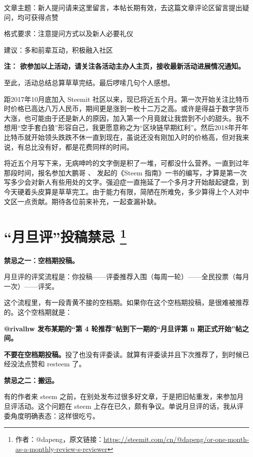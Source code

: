 \documentclass[]{ctexbook}
\begin{document}
文章主题：新人提问请来这里留言，本帖长期有效，去这篇文章评论区留言提出疑问，均可获得点赞

格式要求：注意提问方式以及新人必要礼仪

建议：多和前辈互动，积极融入社区

\textbf{注：
欲参加以上活动，请关注各活动主办人主页，接收最新活动进展情况通知。}

至此，活动总结总算草草完结。最后啰嗦几句个人感想。

距2017年10月底加入 Steemit 社区以来，现已将近五个月。第一次开始关注比特币时价格已高达八万人民币，期间更是涨到一枚十二万之高。或许是得益于数字货币大涨，也可能由于还是新人的原因，加入第一个月竟就让我尝到不小的甜头。我不想用``空手套白狼''形容自己，我更愿意称之为``区块链早期红利''。然后2018年开年比特币就开始领头跌跌不休一直到现在，虽说还没有刚加入时的价格高，但对我来说，有总比没有好，都是花费同样的时间。

将近五个月写下来，无病呻吟的文字倒是积了一堆，可都没什么营养。一直到过年那段时间，报名参加大鹏哥 、\citet{dapeng} 发起的《Steem 指南》一书的编写，才算是第一次写多少会对新人有些用处的文字。强迫症一直拖延了一个多月才开始敲起键盘，到今天硬着头皮算是草草完工。由于能力有限，简陋在所难免，多少算得上个人对中文区一点贡献。期待各位前来补充，一起查漏补缺。

\hypertarget{cn-reader}{%
\section[``月旦评''投稿禁忌 ]{\texorpdfstring{``月旦评''投稿禁忌 \footnote{作者：@dapeng，原文链接：\url{https://steemit.com/cn/@dapeng/or-one-month-as-a-monthly-review-s-reviewer}}}{``月旦评''投稿禁忌 }}\label{cn-reader}}

\textbf{禁忌之一：空档期投稿。}

月旦评的评奖流程是：你投稿------评委推荐入围（每周一轮）------全民投票（每月一次）------评奖。

这个流程里，有一段青黄不接的空档期。如果你在这个空档期投稿，是很难被推荐的。这个空档期就是：

\textbf{@rivalhw 发布某期的``第 4 轮推荐''帖到下一期的``月旦评第 n 期正式开始''帖之间。}

\textbf{不要在空档期投稿。}投了也没有评委读。就算有评委读并且下次推荐了，到时候已经没法点赞和 resteem 了。

\textbf{禁忌之二：搬运。}

有的作者来 steem 之前，在别处发布过很多好文章，于是把旧帖重发，来参加月旦评活动。这个问题在 steem 上存在已久，颇有争议。单说月旦评的话，我从评委角度明确表态：这样很吃亏。
\end{document}
